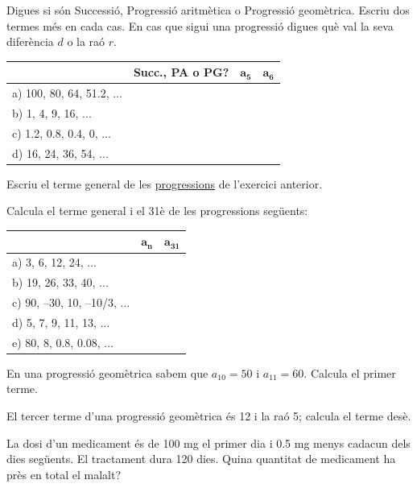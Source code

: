 \begin{mylist}
	
	\item Digues si són Successió, Progressió aritmètica o Progressió geomètrica. Escriu dos termes més en cada cas. En cas que sigui una progressió digues què val la seva diferència $d$ o la raó $r$.
	
	\begin{longtable}{|p{}|p{}|p{}|p{}|} \hline 
	\rowcolor{lightgray}	& \textbf{Succ., PA o PG?} & $\mathbf{a_5}$ & $\mathbf{a_6}$ \\ \hline 
		a) 100, 80, 64, 51.2, ... & & & \\ \hline 
		b) 1, 4, 9, 16, ... & & & \\ \hline 
		c) 1.2, 0.8, 0.4, 0, ...& & & \\ \hline 
		d) 16, 24, 36, 54, ... & & & \\ \hline 
	\end{longtable}

	
	\item Escriu el terme general de les \underline{progressions} de l'exercici anterior.
 	
	\item Calcula el terme general i el 31è de les progressions següents:
	\begin{longtable}{|p{}|p{}|p{}|} \hline 
	\rowcolor{lightgray} & $\mathbf{a_n}$ & $\mathbf{a_{31}}$ \\ \hline 
	a) 3, 6, 12, 24, ... & &  \\ \hline 
	b) 19, 26, 33, 40, ... & &  \\ \hline 
	c) 90, --30, 10, --10/3, ...& &  \\ \hline 
	d) 5, 7, 9, 11, 13, ... & &  \\ \hline 
	e) 80, 8, 0.8, 0.08, ... & &  \\ \hline 
	\end{longtable}	 
	
	\item En una progressió geomètrica sabem que $a_{10}=50$ i $a_{11}=60$. Calcula el primer terme.
	  
	\item El tercer terme d'una progressió geomètrica és 12 i la raó 5; calcula el terme desè.
	
	\item La dosi d'un medicament és de 100 mg el primer dia i 0.5 mg menys cadacun dels dies següents. El tractament dura 120 dies. Quina quantitat de medicament ha près en total el malalt?
	

\end{mylist}
